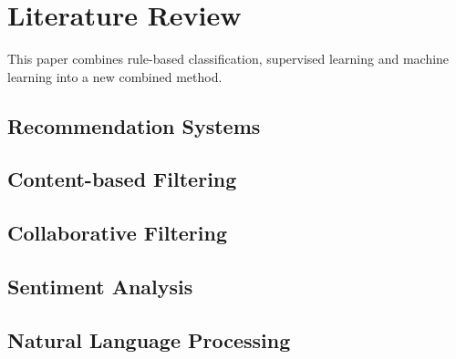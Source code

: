\chapter{Literature Review}

This paper combines rule-based classification, supervised learning and machine learning into a new combined method.
\section{Recommendation Systems}
\section{Content-based Filtering}
\section{Collaborative Filtering}
\section{Sentiment Analysis}
\section{Natural Language Processing}

